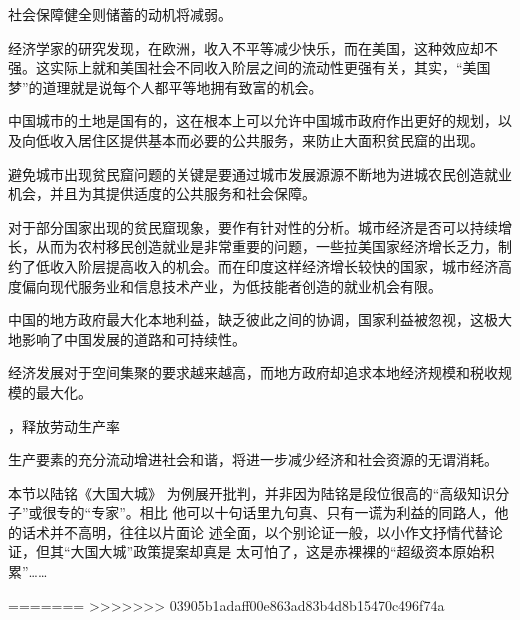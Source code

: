 社会保障健全则储蓄的动机将减弱。

经济学家的研究发现，在欧洲，收入不平等减少快乐，而在美国，这种效应却不强。这实际上就和美国社会不同收入阶层之间的流动性更强有关，其实，“美国梦”的道理就是说每个人都平等地拥有致富的机会。

中国城市的土地是国有的，这在根本上可以允许中国城市政府作出更好的规划，以及向低收入居住区提供基本而必要的公共服务，来防止大面积贫民窟的出现。

避免城市出现贫民窟问题的关键是要通过城市发展源源不断地为进城农民创造就业机会，并且为其提供适度的公共服务和社会保障。

对于部分国家出现的贫民窟现象，要作有针对性的分析。城市经济是否可以持续增长，从而为农村移民创造就业是非常重要的问题，一些拉美国家经济增长乏力，制约了低收入阶层提高收入的机会。而在印度这样经济增长较快的国家，城市经济高度偏向现代服务业和信息技术产业，为低技能者创造的就业机会有限。

中国的地方政府最大化本地利益，缺乏彼此之间的协调，国家利益被忽视，这极大地影响了中国发展的道路和可持续性。

经济发展对于空间集聚的要求越来越高，而地方政府却追求本地经济规模和税收规模的最大化。

，释放劳动生产率

生产要素的充分流动增进社会和谐，将进一步减少经济和社会资源的无谓消耗。

本节以陆铭《大国大城》
为例展开批判，并非因为陆铭是段位很高的“高级知识分子”或很专的“专家”。相比
他可以十句话里九句真、只有一谎为利益的同路人，他的话术并不高明，往往以片面论
述全面，以个别论证一般，以小作文抒情代替论证，但其“大国大城”政策提案却真是
太可怕了，这是赤裸裸的“超级资本原始积累”……



=======
>>>>>>> 03905b1adaff00e863ad83b4d8b15470c496f74a
